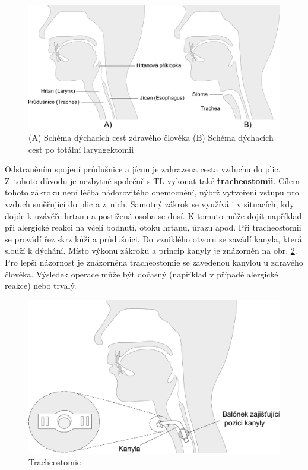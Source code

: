 \begin{figure}[htb]
  \begin{center}
    \def\svgwidth{0.9\linewidth}
    \includegraphics[width=0.9\linewidth]{ch2-cause/figures/dychaci-cesty-tl}
    \caption[Schéma dýchacích cest zdravého člověka (A) pacienta po totální laryngektomii (B)]{(A) Schéma dýchacích cest zdravého člověka (B) Schéma dýchacích cest po totální laryngektomii}
    \label{fig:cause:desease:laryngectomy}
  \end{center}
\end{figure}

Odstraněním spojení průdušnice a jícnu je zahrazena cesta vzduchu do plic.
Z~tohoto důvodu je nezbytné společně s TL vykonat také \textbf{tracheostomii}.
Cílem tohoto zákroku není léčba nádorovitého onemocnění, nýbrž vytvoření
vstupu pro vzduch směřující do plic a z~nich. Samotný zákrok se využívá i v
situacích, kdy dojde k uzávěře hrtanu a postižená osoba se dusí. K tomuto může
dojít například při alergické reakci na včelí bodnutí, otoku hrtanu, úrazu
apod. Při tracheostomii se provádí řez skrz kůži a průdušnici. Do vzniklého
otvoru se zavádí kanyla, která slouží k dýchání. Místo výkonu zákroku a
princip kanyly je znázorněn na obr. \ref{fig:cause:desease:tracheostomy}. Pro
lepší názornost je znázorněna tracheostomie se zavedenou kanylou u zdravého
člověka. Výsledek operace může být dočasný (například v případě alergické
reakce) nebo trvalý.

\begin{figure}[htb]
  \begin{center}
    \def\svgwidth{0.9\linewidth}
    \includegraphics[width=0.9\linewidth]{ch2-cause/figures/tracheostomie}
    \caption[Tracheostomie]{Tracheostomie}
    \label{fig:cause:desease:tracheostomy}
  \end{center}
\end{figure}

